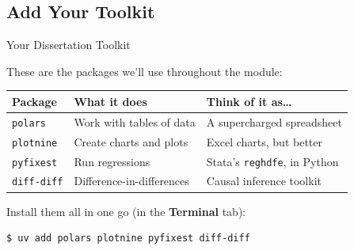 \documentclass[9pt,aspectratio=169]{beamer}
\begin{document}
\subsection{Add Your Toolkit}
\begin{frame}[fragile]{Your Dissertation Toolkit}

These are the packages we'll use throughout the module:

\medskip

\begin{tabular}{@{}llp{5cm}@{}}
\toprule
\textbf{Package} & \textbf{What it does} & \textbf{Think of it as\ldots} \\
\midrule
\texttt{polars} & Work with tables of data & A supercharged spreadsheet \\[0.3em]
\texttt{plotnine} & Create charts and plots & Excel charts, but better \\[0.3em]
\texttt{pyfixest} & Run regressions & Stata's \texttt{reghdfe}, in Python \\[0.3em]
\texttt{diff-diff} & Difference-in-differences & Causal inference toolkit \\
\bottomrule
\end{tabular}

\bigskip

Install them all in one go (in the \textbf{Terminal} tab):

\begin{lstlisting}[style=shell]
$ uv add polars plotnine pyfixest diff-diff
\end{lstlisting}

\end{frame}
\end{document}

